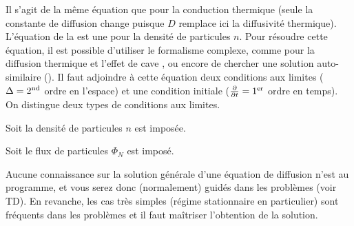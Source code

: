 \documentclass[12pt,fancy]{cours}
\begin{document}
Il s’agit de la même équation que pour la conduction thermique (seule la constante de diffusion change puisque $D$ remplace ici la diffusivité thermique). L’équation de la  est une  pour la densité de particules $n$. Pour résoudre cette équation, il est possible d'utiliser le formalisme complexe, comme pour la diffusion thermique et l’effet de cave
,
ou encore de chercher une solution auto-similaire (). Il faut adjoindre à cette équation deux conditions aux limites ($\Delta = 2^{\rm nd}$ ordre en l’espace)  et une condition initiale ($\frac{\partial{}}{\partial{t}} = 1^{\rm er}$ ordre en temps). On distingue deux types de conditions aux limites.
\begin{liste}
\item Soit la densité de particules $n$ est imposée.
\item Soit le flux de particules $\Phi_N$ est imposé.
\end{liste}

Aucune connaissance sur la solution générale d'une équation de diffusion n'est au programme, et vous serez donc (normalement) guidés dans les problèmes (voir TD).
En revanche, les cas très simples (régime stationnaire en particulier) sont fréquents dans les problèmes et il faut maîtriser l'obtention de la solution.


\end{document}
